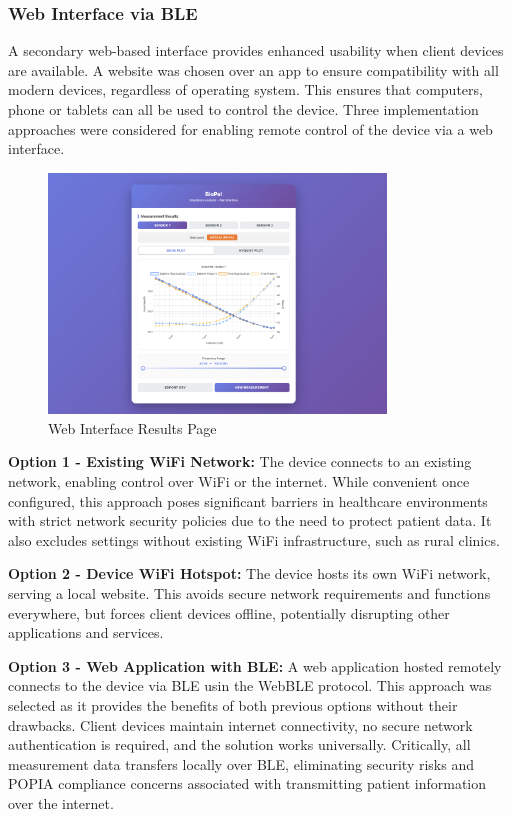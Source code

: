 \subsubsection{Web Interface via BLE}
A secondary web-based interface provides enhanced usability when client devices are available. A website was chosen over an app to ensure compatibility with all modern devices, regardless of operating system. This ensures that computers, phone or tablets can all be used to control the device. Three implementation approaches were considered for enabling remote control of the device via a web interface.

\begin{figure}[H]
    \centering
    \includegraphics[width=0.8\textwidth]{BioPal WebUI.png}
    \caption{Web Interface Results Page}
    \label{fig:web_ui_results}
\end{figure}

\textbf{Option 1 - Existing WiFi Network:} The device connects to an existing network, enabling control over WiFi or the internet. While convenient once configured, this approach poses significant barriers in healthcare environments with strict network security policies due to the need to protect patient data. It also excludes settings without existing WiFi infrastructure, such as rural clinics.

\textbf{Option 2 - Device WiFi Hotspot:} The device hosts its own WiFi network, serving a local website. This avoids secure network requirements and functions everywhere, but forces client devices offline, potentially disrupting other applications and services.

\textbf{Option 3 - Web Application with BLE:} A web application hosted remotely connects to the device via \ac{BLE} usin the WebBLE protocol. This approach was selected as it provides the benefits of both previous options without their drawbacks. Client devices maintain internet connectivity, no secure network authentication is required, and the solution works universally. Critically, all measurement data transfers locally over \ac{BLE}, eliminating security risks and POPIA compliance concerns associated with transmitting patient information over the internet.

